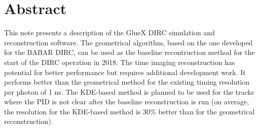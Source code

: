 \section*{Abstract}

This note presents a description of the GlueX DIRC simulation and reconstruction software. The geometrical algorithm, based on the one developed for the BABAR DIRC, can be used as the baseline recontruction method for the start of the DIRC operation in 2018. The time imaging reconstruction has potential for better performance but requires additional development work. It performs better than the geometrical method for the existing timing resolution per photon of 1 ns. The KDE-based method is planned to be used for the tracks where the PID is not clear after the baseline reconstruction is run (on average, the resolution for the KDE-based method is 30{\%} better than for the geometrical reconstruction).

